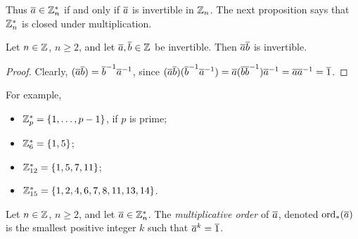 \documentclass{amsart}
\begin{document}
Thus $\overline{a} \in \mathbb{Z}_n^*$ if and only if $\overline{a}$ is invertible in $\mathbb{Z}_n$.
The next proposition says that $\mathbb{Z}_n^*$ is closed under multiplication.

\begin{Prop}
Let $n \in \mathbb{Z}$, $n \ge 2$, and let $\overline{a},\overline{b} \in \mathbb{Z}$ be invertible.
Then $\overline{a} \overline{b}$ is invertible.
\end{Prop}

\begin{proof}
Clearly, $(\overline{a} \overline{b}) = \overline{b}^{-1} \overline{a}^{-1}$, since
$(\overline{a} \overline{b})(\overline{b}^{-1} \overline{a}^{-1}) = \overline{a} ( \overline{b} \overline{b}^{-1} ) \overline{a}^{-1}
    = \overline{a} \overline{a}^{-1} = \overline{1}$.
\end{proof}

For example,
\begin{itemize}
\item $\mathbb{Z}_p^* = \{ 1, \dots, p-1 \}$, if $p$ is prime;
\item $\mathbb{Z}_6^* = \{ 1,5 \}$;
\item $\mathbb{Z}_{12}^* = \{ 1,5,7,11 \}$;
\item $\mathbb{Z}_{15}^* = \{ 1,2,4,6,7,8,11,13,14 \}$.
\end{itemize}

\begin{comment}
\begin{Def}
The {\em Euler phi function} is defined by
\[ \phi : \bN \to \bN \quad \text{ given by } \quad
\phi(n) =
\begin{cases}
    0   \quad &\text{ if $n = 0$}; \\
    1   \quad &\text{ if $n = 0$};\\
    \modu{\bZ_n^*} \quad &\text{ if $n \ge 2$}.
\end{cases}
\]
\end{Def}

Thus, for $n \ge 2$, $\phi(n)$ is the number of positive integers less than $n$ which are relatively
prime to $n$.  For example,
\[ \phi(2) = 1, \; \phi(3) = 2, \; \phi(4) = 2 , \; \phi(5) = 4 , \; \phi(6) = 2 , \; \phi(7) = 6,
    \; \phi(8) = 4 , \; \phi(9) = 6 . \]
In general, if $p$ is prime, then $\phi(p) = p-1$.
\end{comment}

\begin{Def}
Let $n \in \mathbb{Z}$, $n \ge 2$, and let $\overline{a} \in \mathbb{Z}_n^*$.
The {\em multiplicative order} of $\overline{a}$, denoted $\text{\rm{ord}}_*(\overline{a})$ is the smallest positive integer $k$
such that $\overline{a}^k = \overline{1}$.
\end{Def}
\end{document}

